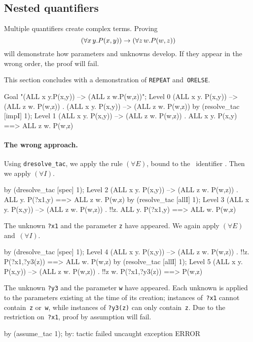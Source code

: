 \subsection{Nested quantifiers}
Multiple quantifiers create complex terms.  Proving 
\[ (\forall x\,y.P(x,y)) \rightarrow (\forall z\,w.P(w,z)) \] 
will demonstrate how parameters and unknowns develop.  If they appear in
the wrong order, the proof will fail.

This section concludes with a demonstration of \texttt{REPEAT}
and~\texttt{ORELSE}.  
\begin{ttbox}
Goal "(ALL x y.P(x,y))  -->  (ALL z w.P(w,z))";
{\out Level 0}
{\out (ALL x y. P(x,y)) --> (ALL z w. P(w,z))}
{. (ALL x y. P(x,y)) --> (ALL z w. P(w,z))}
\ttbreak
by (resolve_tac [impI] 1);
{\out Level 1}
{\out (ALL x y. P(x,y)) --> (ALL z w. P(w,z))}
{. ALL x y. P(x,y) ==> ALL z w. P(w,z)}
\end{ttbox}

\paragraph{The wrong approach.}
Using \texttt{dresolve_tac}, we apply the rule $(\forall E)$, bound to the
\ML\ identifier .  Then we apply $(\forall I)$.
\begin{ttbox}
by (dresolve_tac [spec] 1);
{\out Level 2}
{\out (ALL x y. P(x,y)) --> (ALL z w. P(w,z))}
{. ALL y. P(?x1,y) ==> ALL z w. P(w,z)}
\ttbreak
by (resolve_tac [allI] 1);
{\out Level 3}
{\out (ALL x y. P(x,y)) --> (ALL z w. P(w,z))}
{. !!z. ALL y. P(?x1,y) ==> ALL w. P(w,z)}
\end{ttbox}
The unknown \texttt{?x1} and the parameter \texttt{z} have appeared.  We again
apply $(\forall E)$ and~$(\forall I)$.
\begin{ttbox}
by (dresolve_tac [spec] 1);
{\out Level 4}
{\out (ALL x y. P(x,y)) --> (ALL z w. P(w,z))}
{. !!z. P(?x1,?y3(z)) ==> ALL w. P(w,z)}
\ttbreak
by (resolve_tac [allI] 1);
{\out Level 5}
{\out (ALL x y. P(x,y)) --> (ALL z w. P(w,z))}
{. !!z w. P(?x1,?y3(z)) ==> P(w,z)}
\end{ttbox}
The unknown \texttt{?y3} and the parameter \texttt{w} have appeared.  Each
unknown is applied to the parameters existing at the time of its creation;
instances of~\texttt{?x1} cannot contain~\texttt{z} or~\texttt{w}, while instances
of {\tt?y3(z)} can only contain~\texttt{z}.  Due to the restriction on~\texttt{?x1},
proof by assumption will fail.
\begin{ttbox}
by (assume_tac 1);
{\out by: tactic failed}
{\out uncaught exception ERROR}
\end{ttbox}

